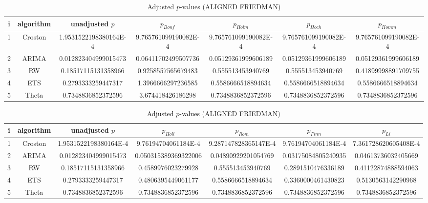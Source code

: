 \documentclass[a4paper,10pt]{article}
\begin{document}
\begin{landscape}
\begin{table}[!htp]
\centering\scriptsize
\caption{Adjusted $p$-values (ALIGNED FRIEDMAN)}
\begin{tabular}{ccccccc}
i&algorithm&unadjusted $p$&$p_{Bonf}$&$p_{Holm}$&$p_{Hoch}$&$p_{Homm}$\\
\hline
1&Croston&1.9531522198380164E-4&9.765761099190082E-4&9.765761099190082E-4&9.765761099190082E-4&9.765761099190082E-4\\
2&ARIMA&0.012823404999015473&0.06411702499507736&0.05129361999606189&0.05129361999606189&0.05129361999606189\\
3&RW&0.18517115131358966&0.9258557565679483&0.555513453940769&0.555513453940769&0.41899998891709755\\
4&ETS&0.2793333259447317&1.3966666297236585&0.5586666518894634&0.5586666518894634&0.5586666518894634\\
5&Theta&0.7348836852372596&3.674418426186298&0.7348836852372596&0.7348836852372596&0.7348836852372596\\
\hline
\end{tabular}
\end{table}

\begin{table}[!htp]
\centering\scriptsize
\caption{Adjusted $p$-values (ALIGNED FRIEDMAN)}
\begin{tabular}{ccccccc}
i&algorithm&unadjusted $p$&$p_{Holl}$&$p_{Rom}$&$p_{Finn}$&$p_{Li}$\\
\hline
1&Croston&1.9531522198380164E-4&9.76194704061184E-4&9.287147828365147E-4&9.76194704061184E-4&7.361728620605408E-4\\
2&ARIMA&0.012823404999015473&0.050315389369322006&0.04890929201054769&0.03175084805240935&0.04613736032405669\\
3&RW&0.18517115131358966&0.4589976023279928&0.555513453940769&0.2891510476336189&0.41122874888594063\\
4&ETS&0.2793333259447317&0.4806395449061177&0.5586666518894634&0.3360000461430823&0.5130563142290968\\
5&Theta&0.7348836852372596&0.7348836852372596&0.7348836852372596&0.7348836852372596&0.7348836852372596\\
\hline
\end{tabular}
\end{table}


\newpage


\end{landscape}
\end{document}

